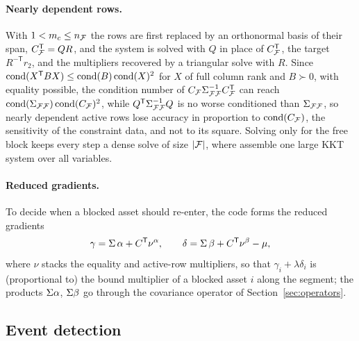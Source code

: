 \paragraph{Nearly dependent rows.}
With $1 < m_c \le n_{\mathcal{F}}$ the rows are first replaced by an orthonormal basis of
their span, $C_{\mathcal{F}}^{\mathsf{T}} = QR$, and the system is solved with $Q$ in place of
$C_{\mathcal{F}}^{\mathsf{T}}$, the target $R^{-\mathsf{T}} r_2$, and the multipliers recovered by a
triangular solve with $R$. Since $\operatorname{cond}(X^{\mathsf{T}} B X) \le \operatorname{cond}(B)\operatorname{cond}(X)^2$
for $X$ of full column rank and $B \succ 0$, with equality possible, the condition number
of $C_{\mathcal{F}} \Sigma_{\mathcal{F}\mathcal{F}}^{-1} C_{\mathcal{F}}^{\mathsf{T}}$ can reach
$\operatorname{cond}(\Sigma_{\mathcal{F}\mathcal{F}})\operatorname{cond}(C_{\mathcal{F}})^2$, while
$Q^{\mathsf{T}}\Sigma_{\mathcal{F}\mathcal{F}}^{-1} Q$ is no worse conditioned than $\Sigma_{\mathcal{F}\mathcal{F}}$, so nearly
dependent active rows lose accuracy in proportion to $\operatorname{cond}(C_{\mathcal{F}})$, the
sensitivity of the constraint data, and not to its square. Solving only for the free block keeps every step a dense solve of size
$|\mathcal{F}|$, where \citet{markowitz2021} assemble one large KKT system over all variables.

\paragraph{Reduced gradients.}
To decide when a blocked asset should re-enter, the code forms the reduced gradients
\begin{equation}
\label{eq:gamma}
\gamma = \Sigma\,\alpha + C^{\mathsf{T}} \nu^{\alpha}, \qquad
\delta = \Sigma\,\beta + C^{\mathsf{T}} \nu^{\beta} - \mu,
\end{equation}
where $\nu$ stacks the equality and active-row multipliers, so that $\gamma_i + \lambda\delta_i$ is (proportional to) the bound multiplier of a
blocked asset $i$ along the segment; the products $\Sigma\alpha$, $\Sigma\beta$ go through
the covariance operator of Section~\ref{sec:operators}.

\subsection{Event detection}
\label{sec:events}

